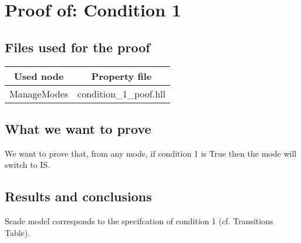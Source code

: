 \section{Proof of: Condition 1}
\label{condition-1}
\subsection{Files used for the proof}
\begin{tabular}{|c|c|}
\hline
Used node & Property file \\ \hline
ManageModes & condition\_1\_poof.hll \\
\hline
\end{tabular}


\subsection{What we want to prove}
We want to prove that, from any mode, if condition 1 is True then the
mode will switch to IS.


\subsection{Results and conclusions}
Scade model corresponds to the specifcation of condition 1
(cf. Transitions Table).
